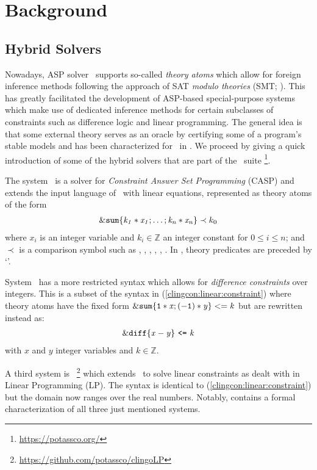 \section{Background}\label{sec:background}

\subsection{Hybrid Solvers}\label{sec:systems}
Nowadays, ASP solver \clingo\ supports so-called \emph{theory atoms} which allow for foreign inference methods \cite{jakaosscscwa17a,karoscwa21a}
following the approach of SAT \emph{modulo theories} (SMT; \cite{SATHandbook}).
%
This has greatly facilitated the development of ASP-based special-purpose systems which make use of dedicated inference methods for
certain subclasses of constraints such as difference logic and linear programming.
%
The general idea is that some external theory serves as an oracle by certifying some of a program's stable models and has been characterized for \clingo\ in \cite{cafascwa23a}.
%
We proceed by giving a quick introduction of some of the hybrid solvers that are part of the \potassco\ suite \footnote{\url{https://potassco.org/}}.

The system \clingcon\ is a solver for \emph{Constraint Answer Set Programming} (CASP) and extends the input language of \clingo\ with linear equations,
represented as theory atoms of the form
\begin{align}\label{clingcon:linear:constraint}
    \mathtt{\&sum\{\mathit{k_1*x_1};\dots;\mathit{k_n*x_n}\}} \prec k_0
\end{align}
where $x_i$ is an integer variable and $k_i\in\mathbb{Z}$ an integer constant for $0\leq i\leq n$;
and $\prec$ is a comparison symbol such as \code{<=}, \code{=}, \code{!=}, \code{<}, \code{>}, \code{>=}.
In \clingo, theory predicates are preceded by `\code{\&}'.

System \clingodl\ has a more restricted syntax which allows for \emph{difference constraints} over integers.
This is a subset of the syntax in (\ref{clingcon:linear:constraint}) where theory atoms have the fixed form
$\mathtt{\&sum\{1 * \mathit{x}; (-1)*\mathit{y}\} <= \mathit{k}}$
but are rewritten instead as:
%
\begin{align}\label{clingodl:difference:constraint}
    \mathtt{\&diff\{\mathit{x}-\mathit{y}\} \ \mbox{\tt <=} \ \mathit{k}}
\end{align}
%
with $x$ and $y$ integer variables and $k \in\mathbb{Z}$.

A third system is \clingolp\ \footnote{\url{https://github.com/potassco/clingoLP}} which extends \clingo\ to solve linear constraints
as dealt with in Linear Programming (LP).
The syntax is identical to (\ref{clingcon:linear:constraint}) but the domain now ranges over the real numbers.
%
Notably, \cite{cafascwa23a} contains a formal characterization of all three just mentioned systems.

